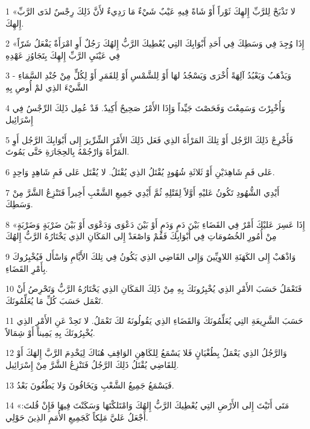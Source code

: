 \par 1 «لا تَذْبَحْ لِلرَّبِّ إِلهِكَ ثَوْراً أَوْ شَاةً فِيهِ عَيْبٌ شَيْءٌ مَا رَدِيءٌ لأَنَّ ذَلِكَ رِجْسٌ لدَى الرَّبِّ إِلهِكَ.
\par 2 «إِذَا وُجِدَ فِي وَسَطِكَ فِي أَحَدِ أَبْوَابِكَ التِي يُعْطِيكَ الرَّبُّ إِلهُكَ رَجُلٌ أَوِ امْرَأَةٌ يَفْعَلُ شَرّاً فِي عَيْنَيِ الرَّبِّ إِلهِكَ بِتَجَاوُزِ عَهْدِهِ
\par 3 وَيَذْهَبُ وَيَعْبُدُ آلِهَةً أُخْرَى وَيَسْجُدُ لهَا أَوْ لِلشَّمْسِ أَوْ لِلقَمَرِ أَوْ لِكُلٍّ مِنْ جُنْدِ السَّمَاءِ - الشَّيْءَ الذِي لمْ أُوصِ بِهِ
\par 4 وَأُخْبِرْتَ وَسَمِعْتَ وَفَحَصْتَ جَيِّداً وَإِذَا الأَمْرُ صَحِيحٌ أَكِيدٌ. قَدْ عُمِل ذَلِكَ الرِّجْسُ فِي إِسْرَائِيل
\par 5 فَأَخْرِجْ ذَلِكَ الرَّجُل أَوْ تِلكَ المَرْأَةَ الذِي فَعَل ذَلِكَ الأَمْرَ الشِّرِّيرَ إِلى أَبْوَابِكَ الرَّجُل أَوِ المَرْأَةَ وَارْجُمْهُ بِالحِجَارَةِ حَتَّى يَمُوتَ.
\par 6 عَلى فَمِ شَاهِدَيْنِ أَوْ ثَلاثَةِ شُهُودٍ يُقْتَلُ الذِي يُقْتَلُ. لا يُقْتَل عَلى فَمِ شَاهِدٍ وَاحِدٍ.
\par 7 أَيْدِي الشُّهُودِ تَكُونُ عَليْهِ أَوَّلاً لِقَتْلِهِ ثُمَّ أَيْدِي جَمِيعِ الشَّعْبِ أَخِيراً فَتَنْزِعُ الشَّرَّ مِنْ وَسَطِكَ.
\par 8 «إِذَا عَسِرَ عَليْكَ أَمْرٌ فِي القَضَاءِ بَيْنَ دَمٍ وَدَمٍ أَوْ بَيْنَ دَعْوَى وَدَعْوَى أَوْ بَيْنَ ضَرْبَةٍ وَضَرْبَةٍ مِنْ أُمُورِ الخُصُومَاتِ فِي أَبْوَابِكَ فَقُمْ وَاصْعَدْ إِلى المَكَانِ الذِي يَخْتَارُهُ الرَّبُّ إِلهُكَ
\par 9 وَاذْهَبْ إِلى الكَهَنَةِ اللاوِيِّينَ وَإِلى القَاضِي الذِي يَكُونُ فِي تِلكَ الأَيَّامِ وَاسْأَل فَيُخْبِرُوكَ بِأَمْرِ القَضَاءِ.
\par 10 فَتَعْمَلُ حَسَبَ الأَمْرِ الذِي يُخْبِرُونَكَ بِهِ مِنْ ذَلِكَ المَكَانِ الذِي يَخْتَارُهُ الرَّبُّ وَتَحْرِصُ أَنْ تَعْمَل حَسَبَ كُلِّ مَا يُعَلِّمُونَكَ.
\par 11 حَسَبَ الشَّرِيعَةِ التِي يُعَلِّمُونَكَ وَالقَضَاءِ الذِي يَقُولُونَهُ لكَ تَعْمَلُ. لا تَحِدْ عَنِ الأَمْرِ الذِي يُخْبِرُونَكَ بِهِ يَمِيناً أَوْ شِمَالاً.
\par 12 وَالرَّجُلُ الذِي يَعْمَلُ بِطُغْيَانٍ فَلا يَسْمَعُ لِلكَاهِنِ الوَاقِفِ هُنَاكَ لِيَخْدِمَ الرَّبَّ إِلهَكَ أَوْ لِلقَاضِي يُقْتَلُ ذَلِكَ الرَّجُلُ فَتَنْزِعُ الشَّرَّ مِنْ إِسْرَائِيل.
\par 13 فَيَسْمَعُ جَمِيعُ الشَّعْبِ وَيَخَافُونَ وَلا يَطْغُونَ بَعْدُ.
\par 14 «مَتَى أَتَيْتَ إِلى الأَرْضِ التِي يُعْطِيكَ الرَّبُّ إِلهُكَ وَامْتَلكْتَهَا وَسَكَنْتَ فِيهَا فَإِنْ قُلتَ: أَجْعَلُ عَليَّ مَلِكاً كَجَمِيعِ الأُمَمِ الذِينَ حَوْلِي.
